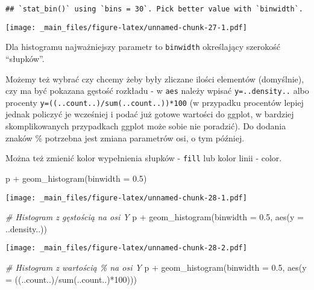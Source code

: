 \documentclass[
]{book}
\newenvironment{Shaded}{\begin{snugshade}}{\end{snugshade}}
\newcommand{\AttributeTok}[1]{\textcolor[rgb]{0.77,0.63,0.00}{#1}}
\newcommand{\CommentTok}[1]{\textcolor[rgb]{0.56,0.35,0.01}{\textit{#1}}}
\newcommand{\DecValTok}[1]{\textcolor[rgb]{0.00,0.00,0.81}{#1}}
\newcommand{\FloatTok}[1]{\textcolor[rgb]{0.00,0.00,0.81}{#1}}
\newcommand{\FunctionTok}[1]{\textcolor[rgb]{0.00,0.00,0.00}{#1}}
\newcommand{\NormalTok}[1]{#1}
\newcommand{\SpecialCharTok}[1]{\textcolor[rgb]{0.00,0.00,0.00}{#1}}
\begin{document}
\begin{verbatim}
## `stat_bin()` using `bins = 30`. Pick better value with `binwidth`.
\end{verbatim}

\texttt{[image: \_main\_files/figure-latex/unnamed-chunk-27-1.pdf]}

Dla histogramu najważniejszy parametr to \texttt{binwidth} określający szerokość ``słupków''.

Możemy też wybrać czy chcemy żeby były zliczane ilości elementów (domyślnie), czy ma być pokazana gęstość rozkładu - w \texttt{aes} należy wpisać \texttt{y=..density..} albo procenty \texttt{y=((..count..)/sum(..count..))*100} (w przypadku procentów lepiej jednak policzyć je wcześniej i podać już gotowe wartości do ggplot, w bardziej skomplikowanych przypadkach ggplot może sobie nie poradzić). Do dodania znaków \% potrzebna jest zmiana parametrów osi, o tym później.

Można też zmienić kolor wypełnienia słupków - \texttt{fill} lub kolor linii - color.

\begin{Shaded}
\begin{Highlighting}[]
\NormalTok{p }\SpecialCharTok{+} \FunctionTok{geom\_histogram}\NormalTok{(}\AttributeTok{binwidth =} \FloatTok{0.5}\NormalTok{)}
\end{Highlighting}
\end{Shaded}

\texttt{[image: \_main\_files/figure-latex/unnamed-chunk-28-1.pdf]}

\begin{Shaded}
\begin{Highlighting}[]
\CommentTok{\# Histogram z gęstością na osi Y}
\NormalTok{p }\SpecialCharTok{+} \FunctionTok{geom\_histogram}\NormalTok{(}\AttributeTok{binwidth =} \FloatTok{0.5}\NormalTok{, }\FunctionTok{aes}\NormalTok{(}\AttributeTok{y =}\NormalTok{ ..density..))}
\end{Highlighting}
\end{Shaded}

\texttt{[image: \_main\_files/figure-latex/unnamed-chunk-28-2.pdf]}

\begin{Shaded}
\begin{Highlighting}[]
\CommentTok{\# Histogram z wartością \% na osi Y}
\NormalTok{p }\SpecialCharTok{+} \FunctionTok{geom\_histogram}\NormalTok{(}\AttributeTok{binwidth =} \FloatTok{0.5}\NormalTok{, }\FunctionTok{aes}\NormalTok{(}\AttributeTok{y =}\NormalTok{ ((..count..)}\SpecialCharTok{/}\FunctionTok{sum}\NormalTok{(..count..)}\SpecialCharTok{*}\DecValTok{100}\NormalTok{)))}
\end{Highlighting}
\end{Shaded}
\end{document}
